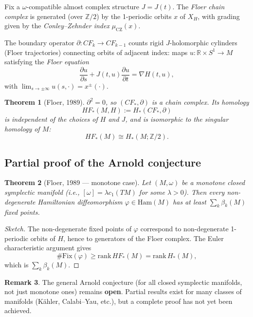 \documentclass[12pt,a4paper]{amsart}
\newtheorem{theorem}{Theorem}[section]
\theoremstyle{definition}
\newtheorem{remark}[theorem]{Remark}
\begin{document}
Fix a $\omega$-compatible almost complex structure $J = J(t)$.  The
\emph{Floer chain complex} is generated (over $\mathbb{Z}/2$) by the
1-periodic orbits $x$ of $X_H$, with grading given by the
\emph{Conley--Zehnder index} $\mu_{\mathrm{CZ}}(x)$.

The boundary operator $\partial: CF_k \to CF_{k-1}$ counts rigid
$J$-holomorphic cylinders (Floer trajectories) connecting orbits of adjacent
index: maps $u: \mathbb{R} \times S^1 \to M$ satisfying the
\emph{Floer equation}
\begin{equation}\label{eq:floer}
  \frac{\partial u}{\partial s} + J(t, u)\frac{\partial u}{\partial t} =
  \nabla H(t, u),
\end{equation}
with $\lim_{s \to \pm\infty} u(s,\cdot) = x^\pm(\cdot)$.

\begin{theorem}[Floer, 1989]\label{thm:floer}
$\partial^2 = 0$, so $(CF_*, \partial)$ is a chain complex.  Its homology
\[
  HF_*(M, H) := H_*(CF_*, \partial)
\]
is independent of the choices of $H$ and $J$, and is isomorphic to the
singular homology of $M$:
\[
  HF_*(M) \cong H_*(M; \mathbb{Z}/2).
\]
\end{theorem}

\subsection{Partial proof of the Arnold conjecture}

\begin{theorem}[Floer, 1989 — monotone case]\label{thm:arnold_floer}
Let $(M, \omega)$ be a monotone closed symplectic manifold
(i.e., $[\omega] = \lambda c_1(TM)$ for some $\lambda > 0$).  Then every
non-degenerate Hamiltonian diffeomorphism $\varphi \in \mathrm{Ham}(M)$
has at least $\sum_k \beta_k(M)$ fixed points.
\end{theorem}

\begin{proof}[Sketch]
The non-degenerate fixed points of $\varphi$ correspond to non-degenerate
1-periodic orbits of $H$, hence to generators of the Floer complex.  The
Euler characteristic argument gives
\[
  \#\mathrm{Fix}(\varphi) \geq \mathrm{rank}\, HF_*(M) = \mathrm{rank}\, H_*(M),
\]
which is $\sum_k \beta_k(M)$.
\end{proof}

\begin{remark}
The general Arnold conjecture (for all closed symplectic manifolds, not just
monotone ones) remains \textbf{open}.  Partial results exist for many classes
of manifolds (K\"{a}hler, Calabi--Yau, etc.), but a complete proof has not
yet been achieved.
\end{remark}
\end{document}
